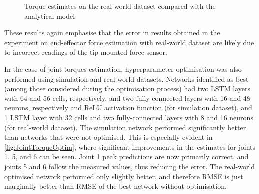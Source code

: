 \begin{figure}
    \hfill
    \caption{Torque estimates on the real-world dataset compared with the analytical model}
    \label{fig:NetworksFrankaTorqueReal}
\end{figure}

These results again emphasise that the error in results obtained in the experiment on end-effector force estimation with real-world dataset are likely due to incorrect readings of the tip-mounted force sensor.

In the case of joint torques estimation, hyperparameter optimisation was also performed using simulation and real-world datasets. Networks identified as best (among those considered during the optimisation process) had two LSTM layers with 64 and 56 cells, respectively, and two fully-connected layers with 16 and 48 neurons, respectively and ReLU activation function (for simulation dataset), and 1 LSTM layer with 32 cells and two fully-connected layers with 8 and 16 neurons (for real-world dataset). The simulation network performed significantly better than networks that were not optimised. This is especially evident in \cref{fig:JointTorqueOptim}, where significant improvements in the estimates for joints 1, 5, and 6 can be seen. Joint 1 peak predictions are now primarily correct, and joints 5 and 6 follow the measured values, thus reducing the error. The real-world optimised network performed only slightly better, and therefore RMSE is just marginally better than RMSE of the best network without optimisation.

